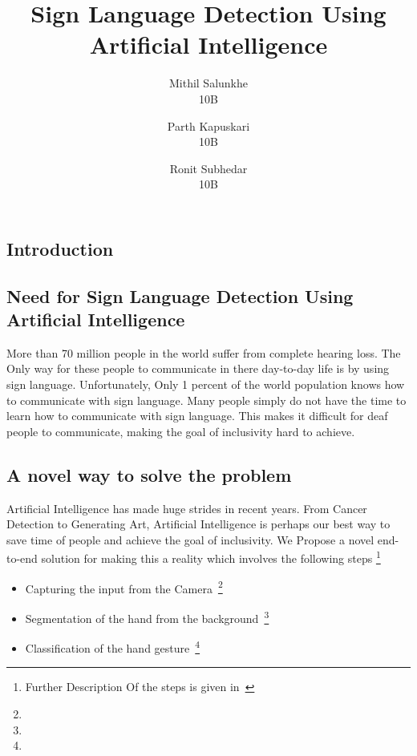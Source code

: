 \documentclass[14pt]{extarticle}
\begin{document}
    \title{Sign Language Detection Using Artificial Intelligence}
    \author{Mithil Salunkhe\\10B   \and Parth Kapuskari\\10B \and Ronit Subhedar\\10B}

    \maketitle
    \begin{multicols}{2}


        \section{Introduction} \label{sec:introduction}

        \subsection{Need for Sign Language Detection Using Artificial Intelligence}\label{subsec:Sign}
        More than 70 million people in the world suffer from complete hearing loss.
        The Only way for these people to communicate in there day-to-day life is by using sign language.
        Unfortunately, Only 1 percent of the world population knows how to communicate with sign language.
        Many people simply do not have the time to learn how to communicate with sign language.
        This makes it difficult for deaf people to communicate, making the goal of inclusivity hard to achieve.

        \subsection{A novel way to solve the problem}\label{subsec:approach}
        Artificial Intelligence has made huge strides in recent years.
        From Cancer Detection to Generating Art, Artificial Intelligence
        is perhaps our best way to save time of people and achieve the goal of inclusivity.
        We Propose a novel end-to-end solution for making this a reality which involves the following steps \footnote{Further Description Of the steps is given in~ }
        \begin{itemize}

            \item Capturing the input from the Camera~\footnote{}
            \item Segmentation of the hand from the background~\footnote{}
            \item Classification of the hand gesture~\footnote{}
        \end{itemize}



\end{multicols}
\end{document}
